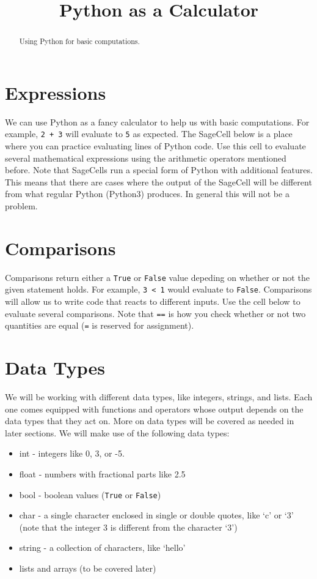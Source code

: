 \documentclass{ximera}
\title{Python as a Calculator}
\begin{document}
  
\begin{abstract}  
Using Python for basic computations.
\end{abstract}  
\maketitle

\section{Expressions}

We can use Python as a fancy calculator to help us with basic computations. For example, \verb|2 + 3| will evaluate to \verb|5| as expected. The SageCell below is a place where you can practice evaluating lines of Python code. Use this cell to evaluate several mathematical expressions using the arithmetic operators mentioned before. Note that SageCells run a special form of Python with additional features. This means that there are cases where the output of the SageCell will be different from what regular Python (Python3) produces. In general this will not be a problem.

\section{Comparisons}

Comparisons return either a \verb|True| or \verb|False| value depeding on whether or not the given statement holds. For example, \verb|3 < 1| would evaluate to \verb|False|. Comparisons will allow us to write code that reacts to different inputs. Use the cell below to evaluate several comparisons. Note that \verb|==| is how you check whether or not two quantities are equal (\verb|=| is reserved for assignment).

\section{Data Types}

We will be working with different data types, like integers, strings, and lists. Each one comes equipped with functions and operators whose output depends on the data types that they act on. More on data types will be covered as needed in later sections. We will make use of the following data types:

\begin{itemize}
	\item int - integers like 0, 3, or -5.
	\item float - numbers with fractional parts like 2.5
	\item bool - boolean values (\verb|True| or \verb|False|)
	\item char - a single character enclosed in single or double quotes, like `c' or `3' (note that the integer 3 is different from the character `3')
	\item string - a collection of characters, like `hello'
	\item lists and arrays (to be covered later)
\end{itemize}
\end{document}
